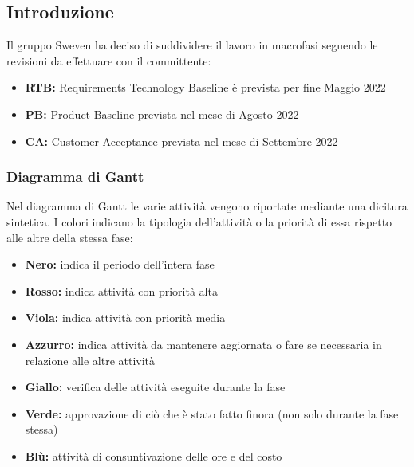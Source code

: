 \subsection{Introduzione}
Il gruppo Sweven ha deciso di suddividere il lavoro in macrofasi seguendo le revisioni da effettuare con il committente:
\begin{itemize}
    \item \textbf{RTB:} Requirements Technology Baseline è prevista per fine Maggio 2022
    \item \textbf{PB:} Product Baseline prevista nel mese di Agosto 2022
    \item \textbf{CA:} Customer Acceptance prevista nel mese di Settembre 2022
\end{itemize}

\subsubsection{Diagramma di Gantt}
Nel diagramma di Gantt le varie attività vengono riportate mediante una dicitura sintetica. 
I colori indicano la tipologia dell'attività o la priorità di essa rispetto alle altre della stessa fase:
\begin{itemize}
    \item \textbf{Nero:} indica il periodo dell'intera fase
    \item \textbf{Rosso:} indica attività con priorità alta
    \item \textbf{Viola:} indica attività con priorità media
    \item \textbf{Azzurro:} indica attività da mantenere aggiornata o fare se necessaria in relazione alle altre attività
    \item \textbf{Giallo:} verifica delle attività eseguite durante la fase
    \item \textbf{Verde:} approvazione di ciò che è stato fatto finora (non solo durante la fase stessa)
    \item \textbf{Blù:} attività di consuntivazione delle ore e del costo
\end{itemize}

